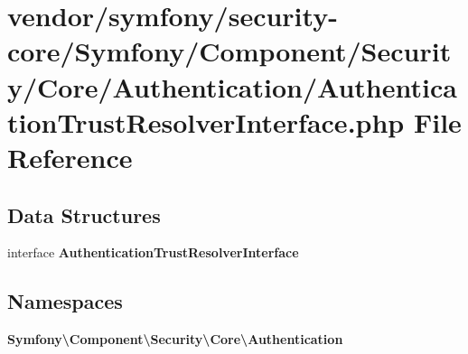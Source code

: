 \section{vendor/symfony/security-\/core/\+Symfony/\+Component/\+Security/\+Core/\+Authentication/\+Authentication\+Trust\+Resolver\+Interface.php File Reference}
\label{_authentication_trust_resolver_interface_8php}
\subsection*{Data Structures}
\begin{DoxyCompactItemize}
\item 
interface {\bf Authentication\+Trust\+Resolver\+Interface}
\end{DoxyCompactItemize}
\subsection*{Namespaces}
\begin{DoxyCompactItemize}
\item 
 {\bf Symfony\textbackslash{}\+Component\textbackslash{}\+Security\textbackslash{}\+Core\textbackslash{}\+Authentication}
\end{DoxyCompactItemize}
